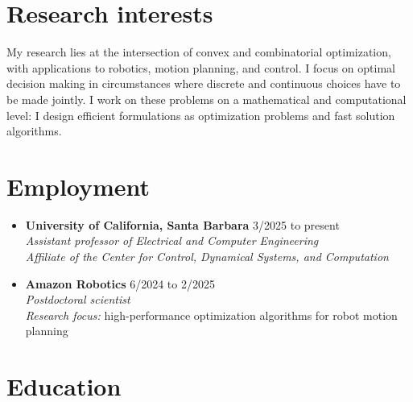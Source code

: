 \documentclass[11pt,a4paper,sans]{moderncv}
\begin{document}
\makecvtitle

\section{Research interests}

My research lies at the intersection of convex and combinatorial optimization, with applications to robotics, motion planning, and control.
I focus on optimal decision making in circumstances where discrete and continuous choices have to be made jointly.
I work on these problems on a mathematical and computational level: I design efficient formulations as optimization problems and fast solution algorithms.

\section{Employment}

\begin{itemize}


\item \textbf{University of California, Santa Barbara} \hfill 3/2025 to present \\
\textit{Assistant professor of Electrical and Computer Engineering} \\
\textit{Affiliate of the Center for Control, Dynamical Systems, and Computation}

\item \textbf{Amazon Robotics} \hfill 6/2024 to 2/2025 \\
\textit{Postdoctoral scientist} \\
\textit{Research focus:} high-performance optimization algorithms for robot motion planning

\end{itemize}

\section{Education}
\end{document}
